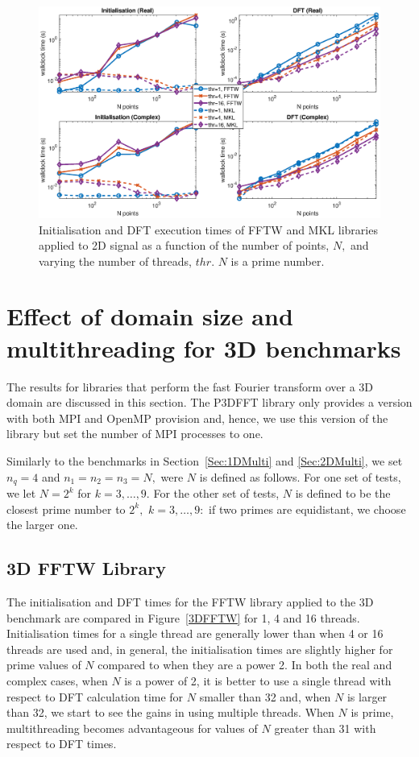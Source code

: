 \documentclass[a4paper]{article}
\begin{document}
\begin{figure}[htb]
    \centering
    \includegraphics[width=0.9\linewidth]{../results/fftw_mkl_prime_2d_thr.eps}
  \caption{Initialisation and DFT execution times of FFTW and MKL libraries applied to 2D signal as a function of the
    number of points, $N,$ and varying the number of threads, $thr.$ $N$ is a prime number.}
  \label{2DFFTWMKLPrime}
\end{figure}





\section{Effect of domain size and multithreading for 3D benchmarks}\label{Sec:3DMulti}
The results for libraries that perform the fast Fourier transform over
a 3D domain are discussed in this section. The P3DFFT library only
provides a version with both MPI and OpenMP provision and, hence, we
use this version of the library but set the number of MPI processes to
one.

Similarly to the benchmarks in Section~\ref{Sec:1DMulti} and \ref{Sec:2DMulti}, we set
$n_q=4$ and $n_1=n_2=n_3=N,$ were $N$ is defined as follows.  For one
set of tests, we let $N=2^k$ for $k=3,\ldots,9.$ For the other set of
tests, $N$ is defined to be the closest prime number to $2^k,$
$k=3,\ldots,9:$ if two primes are equidistant, we choose the larger
one.

\subsection{3D FFTW Library}\label{Sec:3DFFTW}
The initialisation and DFT times for the FFTW library applied to the
3D benchmark are compared in Figure~\ref{3DFFTW} for 1, 4 and 16
threads. Initialisation times for a single thread are generally lower
than when 4 or 16 threads are used and, in general, the initialisation
times are slightly higher for prime values of $N$ compared to when
they are a power 2. In both the real and complex cases, when $N$ is a
power of 2, it is better to use a single thread with respect to DFT
calculation time for $N$ smaller than 32 and, when $N$ is larger than
32, we start to see the gains in using multiple threads. When $N$ is
prime, multithreading becomes advantageous for values of $N$ greater
than 31 with respect to DFT times. 
\end{document}
